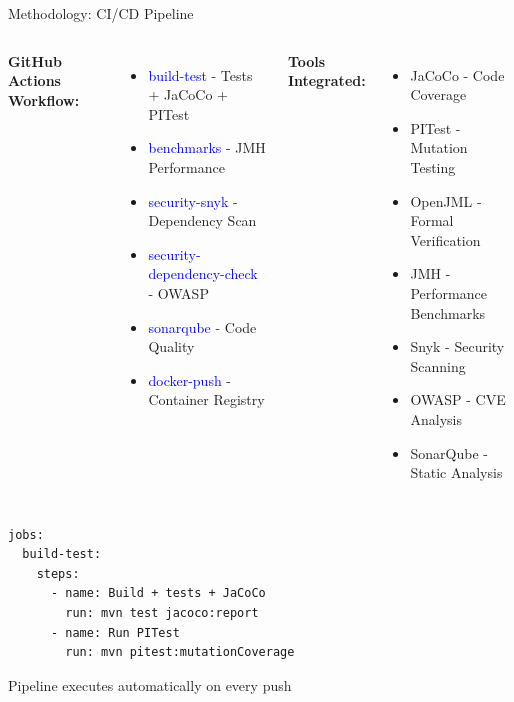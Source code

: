 \documentclass[aspectratio=169]{beamer}
\begin{document}
\begin{frame}{Methodology: CI/CD Pipeline}
\begin{columns}
\textbf{GitHub Actions Workflow:}
\begin{itemize}
    \item \textcolor{blue}{build-test} - Tests + JaCoCo + PITest
    \item \textcolor{blue}{benchmarks} - JMH Performance
    \item \textcolor{blue}{security-snyk} - Dependency Scan
    \item \textcolor{blue}{security-dependency-check} - OWASP
    \item \textcolor{blue}{sonarqube} - Code Quality
    \item \textcolor{blue}{docker-push} - Container Registry
\end{itemize}

\textbf{Tools Integrated:}
\begin{itemize}
    \item JaCoCo - Code Coverage
    \item PITest - Mutation Testing
    \item OpenJML - Formal Verification
    \item JMH - Performance Benchmarks
    \item Snyk - Security Scanning
    \item OWASP - CVE Analysis
    \item SonarQube - Static Analysis
\end{itemize}
\end{columns}

\vspace{0.2cm}
\begin{lstlisting}[style=yamlstyle, basicstyle=\ttfamily\tiny]
jobs:
  build-test:
    steps:
      - name: Build + tests + JaCoCo
        run: mvn test jacoco:report
      - name: Run PITest
        run: mvn pitest:mutationCoverage
\end{lstlisting}

\begin{center}
\small Pipeline executes automatically on every push
\end{center}
\end{frame}
\end{document}
